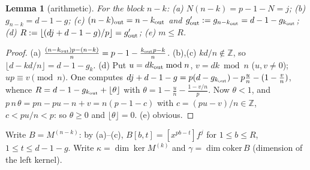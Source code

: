 \documentclass[11pt,a4paper]{article}
\newtheorem{lem}[thm]{Lemma}
\theoremstyle{remark}\newtheorem*{rem}{Remark}
\begin{document}
\begin{lem}[arithmetic]\label{l8} For the block $n-k$: (a) $N(n-k)=p-1-N=j$; (b) $g_{n-k}=d-1-g$; (c) $(n-k)_{\rm out}=n-k_{\rm out}$ and $g'_{\rm out}:=g_{n-k_{\rm out}}=d-1-g_{k_{\rm out}}$; (d) $R:=\lfloor (dj+d-1-g)/p\rfloor=g'_{\rm out}$; (e) $m\le R$.\end{lem}
\begin{proof} (a) $\frac{(n-k_{\rm out})p-(n-k)}{n}=p-1-\frac{k_{\rm out}p-k}{n}$. (b),(c) $kd/n\notin\mathbb Z$, so $\lfloor d-kd/n\rfloor=d-1-g_k$.
(d) Put $u=dk_{\rm out}\bmod n$, $v=dk\bmod n$ ($u,v\ne0$); $up\equiv v\pmod n$. One computes $dj+d-1-g=p(d-g_{k_{\rm out}})-p\frac un-(1-\frac vn)$, whence $R=d-1-g_{k_{\rm out}}+\lfloor\theta\rfloor$ with $\theta=1-\frac un-\frac{1-v/n}{p}$. Now $\theta<1$, and $p\,n\,\theta=pn-pu-n+v=n(p-1-c)$ with $c=(pu-v)/n\in\mathbb Z$, $c<pu/n<p$: so $\theta\ge0$ and $\lfloor\theta\rfloor=0$. (e) obvious.\end{proof}

Write $B=M^{(n-k)}$: by (a)--(c), $B[b,t]=[x^{pb-t}]f^j$ for $1\le b\le R$, $1\le t\le d-1-g$. Write $\kappa=\dim\ker M^{(k)}$ and $\gamma=\dim\mathrm{coker}\,B$ (dimension of the left kernel).
\end{document}
